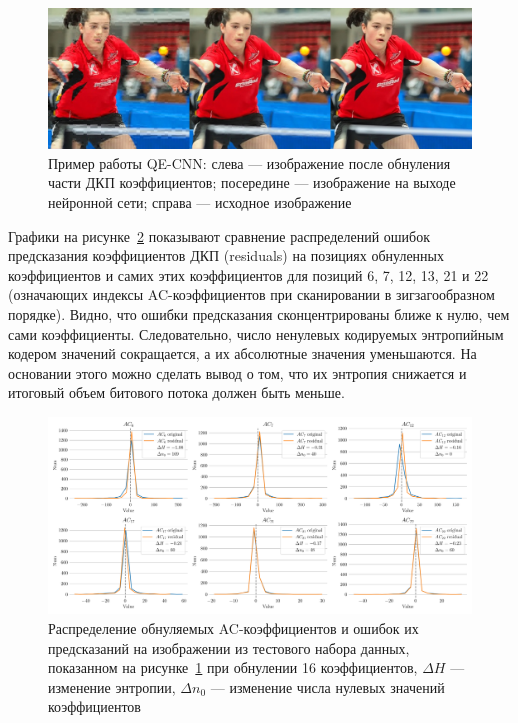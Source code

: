 \documentclass[times,specification,annotation]{itmo-student-thesis}
\begin{document}
\begin{figure}[!h]
    \centering
    \includegraphics[width=\textwidth]{./images/image-transformation-example.png}
    \caption{Пример работы QE-CNN: слева --- изображение после обнуления части ДКП коэффициентов; посередине --- изображение на выходе нейронной сети; справа — исходное изображение}
    \label{image:image-transformation-example}
\end{figure}

Графики на рисунке~\ref{image:coefficients_distribution} показывают сравнение распределений ошибок предсказания коэффициентов ДКП (residuals) на позициях обнуленных коэффициентов и самих этих коэффициентов для позиций 6, 7, 12, 13, 21 и 22 (означающих индексы AC-коэффициентов при сканировании в зигзагообразном порядке). Видно, что ошибки предсказания сконцентрированы ближе к нулю, чем сами коэффициенты. Следовательно, число ненулевых кодируемых энтропийным кодером значений сокращается, а их абсолютные значения уменьшаются. На основании этого можно сделать вывод о том, что их энтропия снижается и итоговый объем битового потока должен быть меньше.

\begin{figure}[!h]
    \centering
    \includegraphics[width=\textwidth]{./images/coefficients_distribution.png}
    \caption{Распределение обнуляемых AC-коэффициентов и ошибок их предсказаний на изображении из тестового набора данных, показанном на рисунке~\ref{image:image-transformation-example} при обнулении 16 коэффициентов, $\Delta H$ --- изменение энтропии, $\Delta n_0$ --- изменение числа нулевых значений коэффициентов}
    \label{image:coefficients_distribution}
\end{figure}
\end{document}
